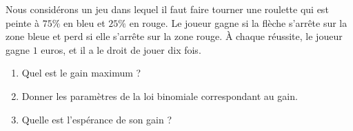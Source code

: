 
\begin{exercice}\label{exoPremiere-0094}

    \begin{multicols}{2}
   Nous considérons un jeu dans lequel il faut faire tourner une roulette qui est peinte à \( 75\%\) en bleu et \( 25\%\) en rouge.  Le joueur gagne si la flèche s'arrête sur la zone bleue et perd si elle s'arrête sur la zone rouge. À chaque réussite, le joueur gagne \( 1\) euros, et il a le droit de jouer dix fois.

   \begin{enumerate}
       \item
           Quel est le gain maximum ?
       \item
           Donner les paramètres de la loi binomiale correspondant au gain.
       \item
           Quelle est l'espérance de son gain ?
   \end{enumerate}

\columnbreak

\begin{center}

\end{center}

    \end{multicols}

\end{exercice}
